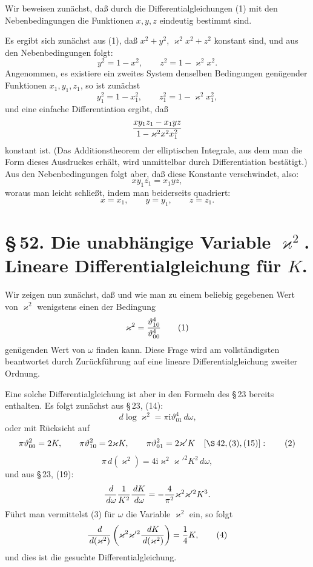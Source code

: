 \documentclass[11pt]{article}
\providecommand{\dd}{\,d}
\providecommand{\tht}{\vartheta}
\providecommand{\ii}{\mathrm{i}}
\begin{document}
Wir beweisen zunächst, daß durch die Differentialgleichungen (1) mit den Nebenbedingungen die Funktionen $x,y,z$ eindeutig bestimmt sind.

Es ergibt sich zunächst aus (1), daß $x^2+y^2$, $\varkappa^2x^2+z^2$ konstant sind, und aus den Nebenbedingungen folgt:
\begin{equation}
y^2=1-x^2,
\qquad
z^2=1-\varkappa^2x^2.
\tag{4}
\end{equation}
Angenommen, es existiere ein zweites System denselben Bedingungen genügender Funktionen $x_1,y_1,z_1$, so ist zunächst
\[
y_1^2=1-x_1^2,
\qquad
z_1^2=1-\varkappa^2x_1^2,
\]
und eine einfache Differentiation ergibt, daß
\[
{xy_1z_1-x_1yz\over 1-\varkappa^2x^2x_1^2}
\]
konstant ist. (Das Additionstheorem der elliptischen Integrale, aus dem man die Form dieses Ausdruckes erhält, wird unmittelbar durch Differentiation bestätigt.) Aus den Nebenbedingungen folgt aber, daß diese Konstante verschwindet, also:
\[
xy_1z_1=x_1yz,
\]
woraus man leicht schließt, indem man beiderseits quadriert:
\[
x=x_1,
\qquad y=y_1,
\qquad z=z_1.
\]

\section*{\S\,52. Die unabhängige Variable $\varkappa^2$. Lineare Differentialgleichung für $K$.}

Wir zeigen nun zunächst, daß und wie man zu einem beliebig gegebenen Wert von $\varkappa^2$ wenigstens einen der Bedingung
\begin{equation}
\varkappa^2={\tht_{10}^4\over\tht_{00}^4}
\tag{1}
\end{equation}
genügenden Wert von $\omega$ finden kann. Diese Frage wird am vollständigsten beantwortet durch Zurückführung auf eine lineare Differentialgleichung zweiter Ordnung.

Eine solche Differentialgleichung ist aber in den Formeln des \S\,23 bereits enthalten. Es folgt zunächst aus \S\,23, (14):
\[
\dd\log\varkappa^2=\pi\ii\tht_{01}^4\dd\omega,
\]
oder mit Rücksicht auf
\begin{equation}
\pi\tht_{00}^2=2K,
\qquad
\pi\tht_{10}^2=2\varkappa K,
\qquad
\pi\tht_{01}^2=2\varkappa'K
\quad[\S\,42,(3),(15)]:
\tag{2}
\end{equation}
\begin{equation}
\pi\dd(\varkappa^2)=4\ii\varkappa^2\varkappa'^2K^2\dd\omega,
\tag{3}
\end{equation}
und aus \S\,23, (19):
\[
{\dd\over\dd\omega}{1\over K^2}{\dd K\over\dd\omega}
=-{4\over\pi^2}\varkappa^2\varkappa'^2K^3.
\]
Führt man vermittelst (3) für $\omega$ die Variable $\varkappa^2$ ein, so folgt
\begin{equation}
{\dd\over\dd(\varkappa^2)}
\left(\varkappa^2\varkappa'^2{\dd K\over\dd(\varkappa^2)}\right)
={1\over4}K,
\tag{4}
\end{equation}
und dies ist die gesuchte Differentialgleichung.
\end{document}
